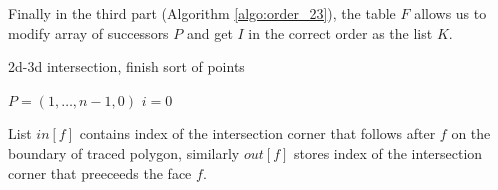 \documentclass{elsarticle}
\def\abs#1{\left|#1\right|}
\def\abs#1{| #1 |}
\newcommand{\notePE}[1]{{\color{Orange} \textbf{PE: } \textit{#1}}}
\begin{document}
% 
% 



Finally in the third part (Algorithm \ref{algo:order_23}), the table $F$ allows us to modify array of successors $P$ and get $I$ in the correct order as the list $K$.










\begin{algorithm}
  \caption{2d-3d intersection, finish sort of points}  
  \label{algo:order_23}
  
  \DontPrintSemicolon
  $P=(1,\dots, n-1,0)$
  $i=0$\;  
  \lFor{$n=0$ \To $\abs{I}-1$}{
    $K[n]=I[i]$
    $i=P[i]$
  }    
  \label{algo:order_23}
\end{algorithm}

  
 List $in[f]$ contains index of the intersection corner that follows after $f$ on the boundary of traced polygon, 
 similarly $out[f]$ stores index of the intersection corner that preeceeds the face $f$.
\end{document}
